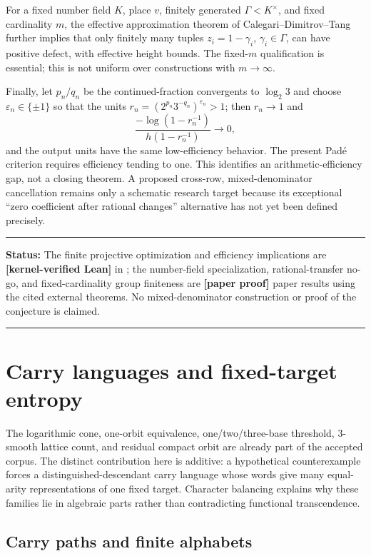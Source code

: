 \documentclass[11pt,oneside]{article}
\theoremstyle{definition}
\theoremstyle{remark}
\newcommand{\lean}[1]{\texttt{\detokenize{#1}}}
\newcommand{\statuslean}{\textcolor{leanblue}{\textbf{[kernel-verified Lean]}}}
\newcommand{\statusnew}{\textcolor{newgreen}{\textbf{[paper proof]}}}
\newenvironment{statusbox}[1]
{\begin{center}\begin{minipage}{0.94\textwidth}\raggedright\hbadness=10000\hrule
\vspace{0.45em}\textbf{Status:} #1\par\vspace{0.35em}}
{\vspace{0.35em}\hrule\end{minipage}\end{center}}
\begin{document}
For a fixed number field $K$, place $v$, finitely generated
$\Gamma<K^\times$, and fixed cardinality $m$, the effective approximation theorem of
Calegari--Dimitrov--Tang~\cite{CDTHolonomy} further implies that only finitely many tuples
$z_i=1-\gamma_i$, $\gamma_i\in\Gamma$, can have positive defect, with effective height
bounds.  The fixed-$m$ qualification is essential; this is not uniform over constructions
with $m\to\infty$.

Finally, let $p_n/q_n$ be the continued-fraction convergents to $\log_2 3$ and choose
$\varepsilon_n\in\{\pm1\}$ so that the units
$r_n=(2^{p_n}3^{-q_n})^{\varepsilon_n}>1$; then $r_n\to1$ and
\[
 \frac{-\log(1-r_n^{-1})}{h(1-r_n^{-1})}\longrightarrow0,
\]
and the output units have the same low-efficiency behavior.  The present Pad\'e criterion
requires efficiency tending to one.  This identifies an arithmetic-efficiency gap, not a
closing theorem.  A proposed cross-row, mixed-denominator cancellation remains only a
schematic research target because its exceptional ``zero coefficient after rational
changes'' alternative has not yet been defined precisely.

\begin{statusbox}{The finite projective optimization and efficiency implications are
\statuslean{} in \lean{ProjectiveDefect}; the
number-field specialization, rational-transfer no-go, and fixed-cardinality group finiteness
are \statusnew{} paper results using the cited external theorems.  No mixed-denominator
construction or proof of the conjecture is claimed.}
\end{statusbox}

\section{Carry languages and fixed-target entropy}
\label{sec:carry-languages}

The logarithmic cone, one-orbit equivalence, one/two/three-base threshold, $3$-smooth lattice
count, and residual compact orbit are already part of the accepted corpus.  The distinct
contribution here is additive: a hypothetical
counterexample forces a distinguished-descendant carry language whose words give many
equal-arity representations of one fixed target.  Character balancing explains why these
families lie in algebraic parts rather than contradicting functional transcendence.

\subsection{Carry paths and finite alphabets}
\label{carry:carry-path}
\end{document}
